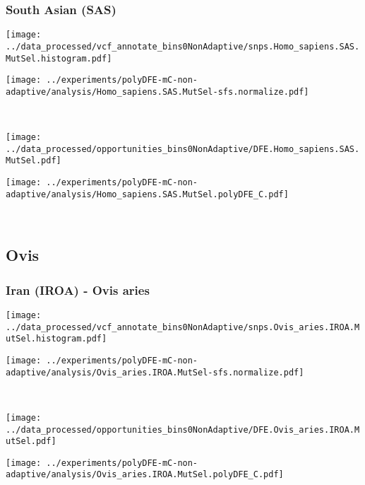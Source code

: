 \subsubsection{South Asian (SAS)}

\begin{minipage}{0.49\linewidth}
    \texttt{[image: ../data\_processed/vcf\_annotate\_bins0NonAdaptive/snps.Homo\_sapiens.SAS.MutSel.histogram.pdf]}
\end{minipage}
\begin{minipage}{0.49\linewidth}
    \texttt{[image: ../experiments/polyDFE-mC-non-adaptive/analysis/Homo\_sapiens.SAS.MutSel-sfs.normalize.pdf]}
\end{minipage}
\\
\begin{minipage}{0.49\linewidth}
    \texttt{[image: ../data\_processed/opportunities\_bins0NonAdaptive/DFE.Homo\_sapiens.SAS.MutSel.pdf]}
\end{minipage}
\begin{minipage}{0.49\linewidth}
    \texttt{[image: ../experiments/polyDFE-mC-non-adaptive/analysis/Homo\_sapiens.SAS.MutSel.polyDFE\_C.pdf]}
\end{minipage}
\\

\subsection{Ovis}

\subsubsection{Iran (IROA) - Ovis aries}

\begin{minipage}{0.49\linewidth}
    \texttt{[image: ../data\_processed/vcf\_annotate\_bins0NonAdaptive/snps.Ovis\_aries.IROA.MutSel.histogram.pdf]}
\end{minipage}
\begin{minipage}{0.49\linewidth}
    \texttt{[image: ../experiments/polyDFE-mC-non-adaptive/analysis/Ovis\_aries.IROA.MutSel-sfs.normalize.pdf]}
\end{minipage}
\\
\begin{minipage}{0.49\linewidth}
    \texttt{[image: ../data\_processed/opportunities\_bins0NonAdaptive/DFE.Ovis\_aries.IROA.MutSel.pdf]}
\end{minipage}
\begin{minipage}{0.49\linewidth}
    \texttt{[image: ../experiments/polyDFE-mC-non-adaptive/analysis/Ovis\_aries.IROA.MutSel.polyDFE\_C.pdf]}
\end{minipage}
\\

